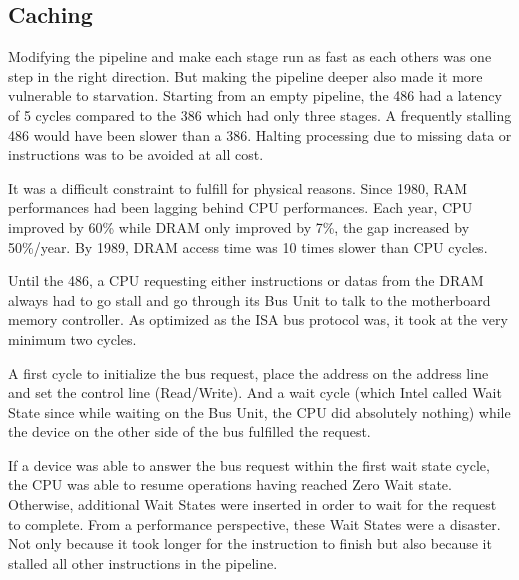 \subsection{Caching }
Modifying the pipeline and make each stage run as fast as each others was one step in the right direction. But making the pipeline deeper also made it more vulnerable to starvation. Starting from an empty pipeline, the 486 had a latency of 5 cycles compared to the 386 which had only three stages. A frequently stalling 486 would have been slower than a 386. Halting processing due to missing data or instructions was to be avoided at all cost.\\
\par
It was a difficult constraint to fulfill for physical reasons. Since 1980, RAM performances had been lagging behind CPU performances. Each year, CPU improved by 60\% while DRAM only improved by 7\%, the gap increased by 50\%/year. By 1989, DRAM access time was 10 times slower than CPU cycles.\\
\par
\vspace{2mm}
\par
Until the 486, a CPU requesting either instructions or datas from the DRAM always had to go stall and go through its Bus Unit to talk to the motherboard memory controller. As optimized as the ISA bus protocol was, it took at the very minimum two cycles.\\
\par 
A first cycle to initialize the bus request, place the address on the address line and set the control line (Read/Write). And a wait cycle (which Intel called Wait State since while waiting on the Bus Unit, the CPU did absolutely nothing) while the device on the other side of the bus fulfilled the request.\\
\par
{}
\par
If a device was able to answer the bus request within the first wait state cycle, the CPU was able to resume operations having reached Zero Wait state. Otherwise, additional Wait States were inserted in order to wait for the request to complete. From a performance perspective, these Wait States were a disaster. Not only because it took longer for the instruction to finish but also because it stalled all other instructions in the pipeline.\\
\par
{}
